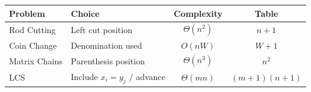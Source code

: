 \begin{center}
\renewcommand{\arraystretch}{1.45}
\begin{tabular}{llcc}
\toprule
\textbf{Problem} & \textbf{Choice} & \textbf{Complexity} & \textbf{Table} \\
\midrule
Rod Cutting         & Left cut position               & $\Theta(n^2)$  & $n+1$ \\
Coin Change         & Denomination used               & $O(nW)$        & $W+1$ \\
Matrix Chains       & Parenthesis position            & $\Theta(n^3)$  & $n^2$ \\
LCS                 & Include $x_i = y_j$ / advance   & $\Theta(mn)$   & $(m+1)(n+1)$ \\
\bottomrule
\end{tabular}
\end{center}